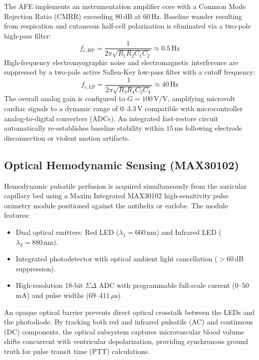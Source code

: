 The AFE implements an instrumentation amplifier core with a Common Mode Rejection Ratio ($\text{CMRR}$) exceeding $80$\,dB at $60$\,Hz. Baseline wander resulting from respiration and cutaneous half-cell polarization is eliminated via a two-pole high-pass filter:
\begin{equation}
    f_{c,\text{HP}} = \frac{1}{2\pi \sqrt{R_1 R_2 C_1 C_2}} \approx 0.5\,\text{Hz}
\end{equation}
High-frequency electromyographic noise and electromagnetic interference are suppressed by a two-pole active Sallen-Key low-pass filter with a cutoff frequency:
\begin{equation}
    f_{c,\text{LP}} = \frac{1}{2\pi \sqrt{R_3 R_4 C_3 C_4}} \approx 40\,\text{Hz}
\end{equation}
The overall analog gain is configured to $G = 100\,\text{V/V}$, amplifying microvolt cardiac signals to a dynamic range of $0$--$3.3$\,V compatible with microcontroller analog-to-digital converters (ADCs). An integrated fast-restore circuit automatically re-establishes baseline stability within $15$\,ms following electrode disconnection or violent motion artifacts.

\subsection{Optical Hemodynamic Sensing (MAX30102)}
Hemodynamic pulsatile perfusion is acquired simultaneously from the auricular capillary bed using a Maxim Integrated MAX30102 high-sensitivity pulse oximetry module positioned against the antihelix or earlobe. The module features:
\begin{itemize}
    \item Dual optical emitters: Red LED ($\lambda_1 = 660\,\text{nm}$) and Infrared LED ($\lambda_2 = 880\,\text{nm}$).
    \item Integrated photodetector with optical ambient light cancellation ($> 60$\,dB suppression).
    \item High-resolution 18-bit $\Sigma\Delta$ ADC with programmable full-scale current ($0$--$50$\,mA) and pulse widths ($69$--$411\,\mu\text{s}$).
\end{itemize}

An opaque optical barrier prevents direct optical crosstalk between the LEDs and the photodiode. By tracking both red and infrared pulsatile (AC) and continuous (DC) components, the optical subsystem captures microvascular blood volume shifts concurrent with ventricular depolarization, providing synchronous ground truth for pulse transit time (PTT) calculations.

